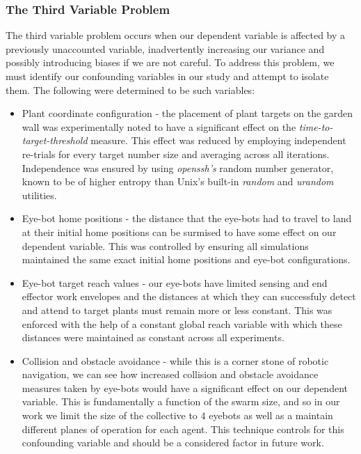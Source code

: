 \documentclass{report}
\begin{document}
\subsubsection{The Third Variable Problem}
The third variable problem occurs when our dependent variable is affected by a previously unaccounted variable, inadvertently increasing our variance and possibly introducing biases if we are not careful. To address this problem, we must identify our confounding variables in our study and attempt to isolate them.
The following were determined to be such variables:
\begin{itemize}
	\item Plant coordinate configuration - the placement of plant targets on the garden wall was experimentally noted to have a significant effect on the \textit{time-to-target-threshold} measure. This effect was reduced by employing independent re-trials for every target number size and averaging across all iterations. Independence was ensured by using \textit{openssh's} random number generator, known to be of higher entropy than Unix's built-in \textit{random} and \textit{urandom} utilities.
	\item Eye-bot home positions - the distance that the eye-bots had to travel to land at their initial home positions can be surmised to have some effect on our dependent variable. This was controlled by ensuring all simulations maintained the same exact initial home positions and eye-bot configurations.
	\item Eye-bot target reach values - our eye-bots have limited sensing and end effector work envelopes and the distances at which they can successfuly detect and attend to target plants must remain more or less constant. This was enforced with the help of a constant global reach variable with which these distances were maintained as constant across all experiments.
	\item Collision and obstacle avoidance - while this is a corner stone of robotic navigation, we can see how increased collision and obstacle avoidance measures taken by eye-bots would have a significant effect on our dependent variable. This is fundamentally a function of the swarm size, and so in our work we limit the size of the collective to 4 eyebots as well as a maintain different planes of operation for each agent. This technique controls for this confounding variable and should be a considered factor in future work.
\end{itemize}
\end{document}
